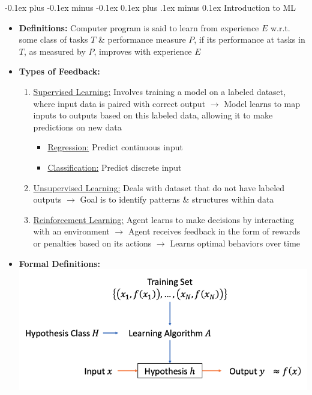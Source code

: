 \documentclass[landscape]{article}
\makeatletter
\renewcommand{\subsection}{\@startsection{subsection}{2}{0mm}%
  {-0.1ex plus -0.1ex minus -0.1ex}%
  {0.1ex plus .1ex minus 0.1ex}%
{\normalfont\scriptsize\bfseries}}
\makeatother
\begin{document}
\begin{multicols*}{5}
    \subsection{Introduction to ML}
    \begin{itemize}
      \item \textbf{Definitions:} Computer program is said to learn from experience $E$ w.r.t. some class of tasks $T$ \& performance measure $P$, if its performance at tasks in $T$, as measured by $P$, improves with experience $E$
      \item \textbf{Types of Feedback:}
      \begin{enumerate}
        \item \underline{Supervised Learning:} Involves training a model on a labeled dataset, where input data is paired with correct output $\rightarrow$ Model learns to map inputs to outputs based on this labeled data, allowing it to make predictions on new data
        \begin{itemize}
          \item \underline{Regression:} Predict continuous input
          \item \underline{Classification:} Predict discrete input
        \end{itemize} 
        \item \underline{Unsupervised Learning:} Deals with dataset that do not have labeled outputs $\rightarrow$ Goal is to identify patterns \& structures within data
        \item \underline{Reinforcement Learning:} Agent learns to make decisions by interacting with an environment $\rightarrow$ Agent receives feedback in the form of rewards or penalties based on its actions $\rightarrow$ Learns optimal behaviors over time
      \end{enumerate}
      \item \textbf{Formal Definitions:}
      \includegraphics[width=0.75\linewidth]{8_ml_formal.png}
    \end{itemize}


\end{multicols*}
\end{document}
